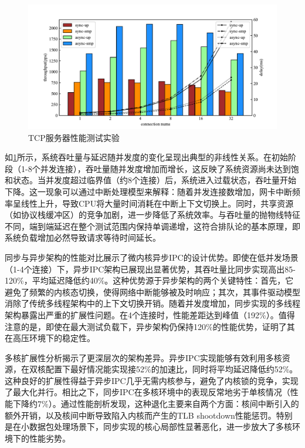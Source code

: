 \begin{figure}[htbp]
    \centering
    \includegraphics[width=1.0\textwidth]{figures/tcp_test.pdf}
    \caption{TCP服务器性能测试实验}\label{fig:tcp_test_res}
\end{figure}

如\ref{fig:tcp_test_res}所示，系统吞吐量与延迟随并发度的变化呈现出典型的非线性关系。在初始阶段（1-8个并发连接），吞吐量随并发度增加而增长，这反映了系统资源尚未达到饱和状态。当并发度超过临界值（约8个连接）后，系统进入过载状态，吞吐量开始下降。这一现象可以通过中断处理模型来解释：随着并发连接数增加，网卡中断频率呈线性上升，导致CPU将大量时间消耗在中断上下文切换上。同时，共享资源（如协议栈缓冲区）的竞争加剧，进一步降低了系统效率。与吞吐量的抛物线特征不同，端到端延迟在整个测试范围内保持单调递增，这符合排队论的基本原理，即系统负载增加必然导致请求等待时间延长。

同步与异步架构的性能对比展示了微内核异步IPC的设计优势。即使在低并发场景（1-4个连接）下，异步IPC架构已展现出显著优势，其吞吐量比同步实现高出85-120\%，平均延迟降低约40\%。这种优势源于异步架构的两个关键特性：首先，它避免了频繁的内核态切换，使得网络中断能够被及时响应；其次，其事件驱动模型消除了传统多线程架构中的上下文切换开销。随着并发度增加，同步实现的多线程架构暴露出严重的扩展性问题。在4个连接时，性能差距达到峰值（192\%）。值得注意的是，即使在最大测试负载下，异步架构仍保持120\%的性能优势，证明了其在高压环境下的稳定性。

多核扩展性分析揭示了更深层次的架构差异。异步IPC实现能够有效利用多核资源，在双核配置下最好情况能实现接52\%的加速比，同时将平均延迟降低约52\%。这种良好的扩展性得益于异步IPC几乎无需内核参与，避免了内核锁的竞争，实现了最大化并行。相比之下，同步IPC在多核环境中的表现反常地劣于单核情况（性能下降约7\%）。通过性能剖析发现，这种退化主要来自两个方面：核间中断引入的额外开销，以及核间中断导致陷入内核而产生的TLB shootdown性能惩罚。特别是在小数据包处理场景下，同步实现的核心局部性显著恶化，进一步放大了多核环境下的性能劣势。

